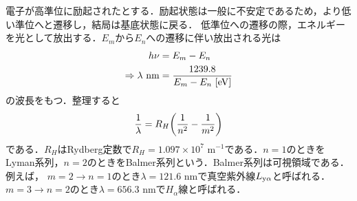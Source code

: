 \documentclass{report}
\begin{document}
      電子が高準位に励起されたとする．励起状態は一般に不安定であるため，より低い準位へと遷移し，結局は基底状態に戻る．
      低準位への遷移の際，エネルギーを光として放出する．$E_m$から$E_n$への遷移に伴い放出される光は
      \begin{align}
        h\nu &= E_m - E_n\\
        \Rightarrow \lambda\ \r{nm} &= \frac{1239.8}{E_m - E_n\ [\r{eV}]}
      \end{align}
      の波長をもつ．整理すると
      \begin{align}
        \frac{1}{\lambda} = R_H\qty(\frac{1}{n^2} - \frac{1}{m^2})
      \end{align}
      である．$R_H$はRydberg定数で$R_H = 1.097 \times 10^7$ m$^{-1}$である．$n=1$のときをLyman系列，$n=2$のときをBalmer系列という．Balmer系列は可視領域である．例えば，
      $m=2\to n=1$のとき$\lambda = 121.6$ nmで真空紫外線$L_{\mathrm{y\alpha}}$と呼ばれる．$m=3\to n=2$のとき$\lambda = 656.3$ nmで$H_{\alpha}$線と呼ばれる．
\end{document}
